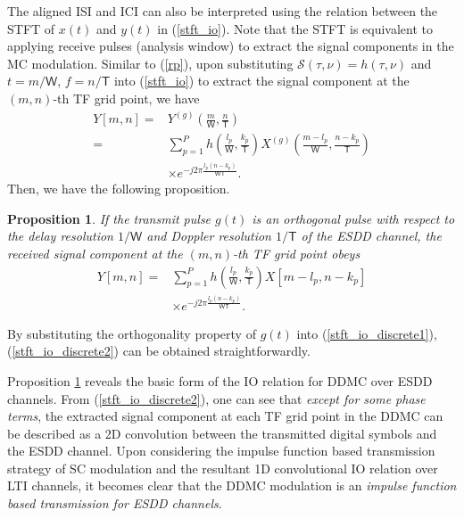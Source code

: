 \documentclass[journal]{IEEEtran}
\newtheorem{prop}{Proposition}
\begin{document}
The aligned ISI and ICI can also be interpreted using the relation between the STFT of $x(t)$ and $y(t)$ in (\ref{stft_io}). Note that the STFT is equivalent to applying receive pulses (analysis window) to extract the signal components in {the} MC modulation. Similar to (\ref{rp}), upon substituting $\mathcal S(\tau,\nu)=h(\tau,\nu)$ and $t=m/\mathsf W$, $f=n/\mathsf T$  into (\ref{stft_io}) to extract the signal component at  the $(m,n)$-th TF grid point, we have
\begin{align}\label{stft_io_discrete1}
  Y[m,n] = & Y^{(g)}\left(\frac{m}{\mathsf W},\frac{n}{\mathsf T}\right)  \nonumber                                                                                \\
  =        & \sum_{p=1}^P h\left(\frac{l_p}{\mathsf W},\frac{k_p}{\mathsf T}\right) X^{(g)}\left(\frac{m-l_p}{\mathsf W}, \frac{n-k_p}{\mathsf T}\right) \nonumber \\
           & \times e^{-j2\pi \frac{l_p(n-k_p)}{\mathsf W\mathsf T}}.
\end{align}
Then, we have the following proposition.
\begin{prop}\label{l0}
  If the transmit pulse $g(t)$ is an orthogonal pulse with respect to {the delay resolution $1/\mathsf W$ and Doppler resolution $1/\mathsf T$ of the ESDD channel}, the received signal component at the $(m,n)$-th TF grid point obeys
  \begin{align}\label{stft_io_discrete2}
    Y[m,n]
    = & \sum_{p=1}^P h\left(\frac{l_p}{\mathsf W},\frac{k_p}{\mathsf T}\right) X[m-l_p,n-k_p]
    \nonumber                                                                                 \\
      & \times  e^{-j2\pi \frac{l_p(n-k_p)}{\mathsf W\mathsf T}}.
  \end{align}
\end{prop}
\begin{IEEEproof}
  By substituting the orthogonality property of $g(t)$ into (\ref{stft_io_discrete1}), (\ref{stft_io_discrete2}) can be obtained straightforwardly.
\end{IEEEproof}

Proposition \ref{l0} reveals the basic form of the IO relation for DDMC over ESDD channels. 
From (\ref{stft_io_discrete2}), one can see that \emph{except for some phase terms}, the extracted signal component at each TF grid point in the DDMC can be described as a 2D convolution between the transmitted digital symbols and the ESDD channel. Upon considering the impulse function based transmission strategy of SC modulation and the resultant 1D convolutional IO relation over LTI channels, it becomes clear that the DDMC modulation is an \emph{impulse function based transmission for ESDD channels}.
\end{document}
